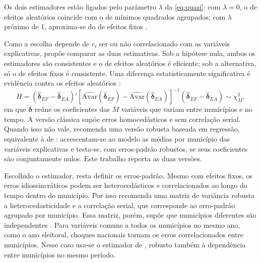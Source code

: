 Os dois estimadores estão ligados pelo parâmetro $\lambda$ da \autoref{eq:quasi}: com $\lambda = 0$, o de efeitos aleatórios coincide com o de mínimos quadrados agrupados; com $\lambda$ próximo de 1, aproxima-se do de efeitos fixos \parencite[p.~287]{wooldridge2002}.

Como a escolha depende de $c_i$ ser ou não correlacionado com as variáveis explicativas, \textcite{hausman1978} propôs comparar as duas estimativas. Sob a hipótese nula, ambos os estimadores são consistentes e o de efeitos aleatórios é eficiente; sob a alternativa, só o de efeitos fixos é consistente. Uma diferença estatisticamente significativa é evidência contra os efeitos aleatórios \parencite[p.~288--289]{wooldridge2002}:
\begin{equation}\label{eq:hausman}
H = (\hat{\boldsymbol{\delta}}_{EF} - \hat{\boldsymbol{\delta}}_{EA})' \left[ \widehat{\mathrm{Avar}}(\hat{\boldsymbol{\delta}}_{EF}) - \widehat{\mathrm{Avar}}(\hat{\boldsymbol{\delta}}_{EA}) \right]^{-1} (\hat{\boldsymbol{\delta}}_{EF} - \hat{\boldsymbol{\delta}}_{EA}) \sim \chi^2_M,
\end{equation}
em que $\boldsymbol{\delta}$ reúne os coeficientes das $M$ variáveis que variam entre municípios e no tempo. A versão clássica supõe erros homocedásticos e sem correlação serial. Quando isso não vale, \textcite[p.~290--291]{wooldridge2002} recomenda uma versão robusta baseada em regressão, equivalente à de \textcite{mundlak1978}: acrescentam-se ao modelo as médias por município das variáveis explicativas e testa-se, com erros-padrão robustos, se seus coeficientes são conjuntamente nulos. Este trabalho reporta as duas versões.

Escolhido o estimador, resta definir os erros-padrão. Mesmo com efeitos fixos, os erros idiossincráticos podem ser heterocedásticos e correlacionados ao longo do tempo dentro do município. Por isso \textcite[p.~274--276]{wooldridge2002} recomenda uma matriz de variância robusta a heterocedasticidade e a correlação serial, que corresponde ao erro-padrão agrupado por município. Essa matriz, porém, supõe que municípios diferentes são independentes \parencite[p.~250]{wooldridge2002}. Para variáveis comuns a todos os municípios no mesmo ano, como o ano eleitoral, choques nacionais tornam os erros correlacionados entre municípios. Nesse caso usa-se o estimador de \textcite{driscoll1998}, robusto também à dependência entre municípios no mesmo período.

